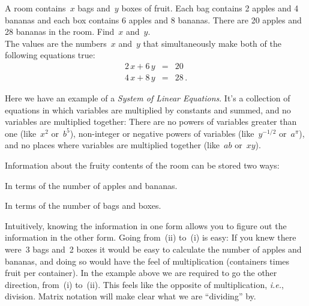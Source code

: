 \begin{example} 
A room contains~$x$ bags and~$y$ boxes of fruit. 
Each bag contains 2 apples and 4 bananas and each box contains 6 apples and 8 bananas. 
There are 20 apples and 28 bananas in the room. Find~$x$ and~$y$.
\\


\noindent
The values are the numbers~$x$ and~$y$ that simultaneously make both of the following equations true:
\begin{eqnarray*}
	2\, x + 6\, y & =  & 20 \\
	4\, x + 8\, y & = & 28\, .
\end{eqnarray*}
\end{example}
Here we have an example of a \emph{System of Linear Equations}.  It's a collection of equations in which variables are multiplied by constants and summed, and no variables are multiplied together:  There are no powers of variables greater than one (like~$x^2$ or~$b^5$), non-integer or negative powers of variables (like~$y^{-1/2}$ or~$a^{\pi}$), and no places where variables are multiplied together (like~$ab$ or~$xy$).

%
\noindent
Information about the fruity contents of the room can be stored two ways: 
\begin{enumext}[label=\roman*,wrap-label=(#1)]
\item In terms of the number of apples and bananas. 
\item In terms of the number of bags and boxes. 
\end{enumext}
Intuitively, knowing the information in one form allows you to figure out the information in the other form. 
Going from~(ii) to~(i) is easy: 
If you knew there were~3 bags and~2 boxes it would be easy to calculate the number of apples and bananas, and doing so would have the feel of multiplication (containers times fruit per container). 
In the example above we are required to go the other direction, from~(i) to~(ii). This  feels like the opposite of multiplication, {\itshape i.e.}, division. Matrix notation will 
make clear what we are ``dividing'' by. 

